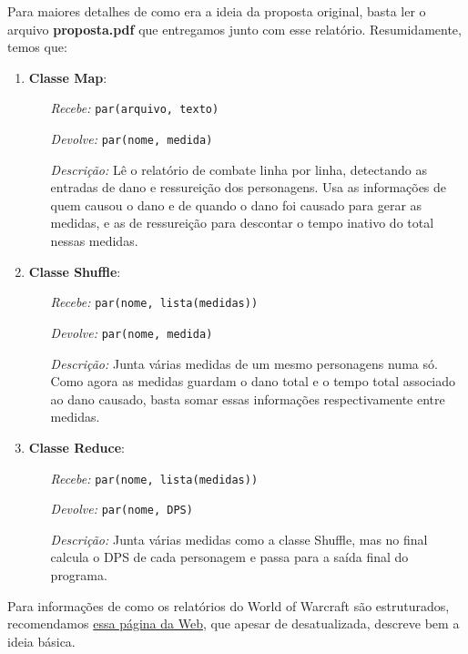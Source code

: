 \documentclass[a4paper,11pt]{article}
\begin{document}
  Para maiores detalhes de como era a ideia da proposta original, basta ler o
  arquivo \textbf{proposta.pdf} que entregamos junto com esse relatório.
  Resumidamente, temos que:
  
  \begin{enumerate}
    \item
      \textbf{Classe Map}:
      \begin{itemize}
        \item[\textit{Recebe:}] \verb$par(arquivo, texto)$
        \item[\textit{Devolve:}] \verb$par(nome, medida)$
        \item[\textit{Descrição:}]
          Lê o relatório de combate linha por linha, detectando as entradas de
          dano e ressureição dos personagens. Usa as informações de quem causou
          o dano e de quando o dano foi causado para gerar as medidas, e as de
          ressureição para descontar o tempo inativo do total nessas medidas.
      \end{itemize}
    \item
      \textbf{Classe Shuffle}:
      \begin{itemize}
        \item[\textit{Recebe:}] \verb$par(nome, lista(medidas))$
        \item[\textit{Devolve:}] \verb$par(nome, medida)$
        \item[\textit{Descrição:}]
          Junta várias medidas de um mesmo personagens numa só. Como agora as
          medidas guardam o dano total e o tempo total associado ao dano
          causado, basta somar essas informações respectivamente entre medidas.
      \end{itemize}
    \item
      \textbf{Classe Reduce}:
      \begin{itemize}
        \item[\textit{Recebe:}] \verb$par(nome, lista(medidas))$
        \item[\textit{Devolve:}] \verb$par(nome, DPS)$
        \item[\textit{Descrição:}]
          Junta várias medidas como a classe Shuffle, mas no final calcula o
          DPS de cada personagem e passa para a saída final do programa.
      \end{itemize}
  \end{enumerate}
  
  Para informações de como os relatórios do World of Warcraft são estruturados,
  recomendamos \href{http://www.wowwiki.com/API_COMBAT_LOG_EVENT}{essa página da
  Web}, que apesar de desatualizada, descreve bem a ideia básica.
  
\end{document}
